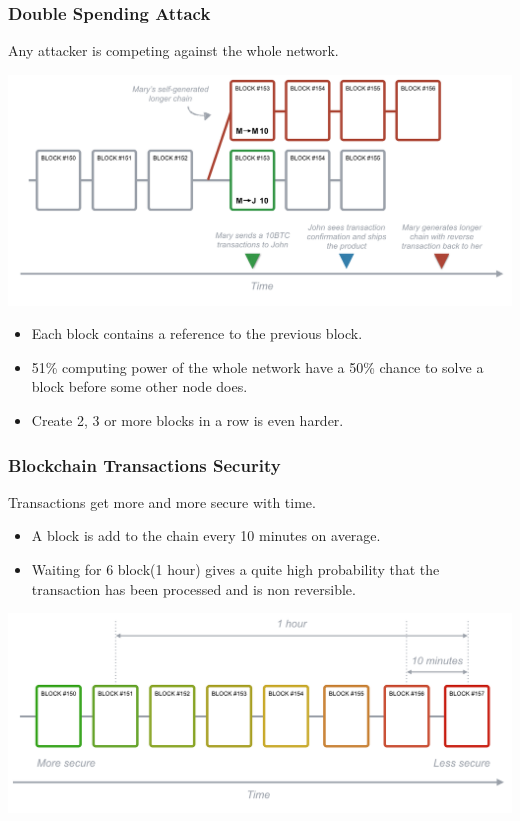 \begin{frame}
    \frametitle{Double Spending Attack}
    Any attacker is competing against the whole network.
    \begin{center}
        \includegraphics[scale=0.16]{./figures/double-spending.png}
    \end{center}
    \begin{itemize}
        \item Each block contains a reference to the previous block.
        \item 51\% computing power of the whole network have a 50\% chance to solve a block before some other node does.
        \item Create 2, 3 or more blocks in a row is even harder.
    \end{itemize}
\end{frame}

\begin{frame}
    \frametitle{Blockchain Transactions Security}
    Transactions get more and more secure with time.
    \begin{itemize}
        \item A block is add to the chain every 10 minutes on average.
        \item Waiting for 6 block(1 hour) gives a quite high probability that the transaction has been processed and is \alert{non reversible}.
    \end{itemize}
    \includegraphics[scale=0.2]{./figures/bitcoin-security.png}
\end{frame}

